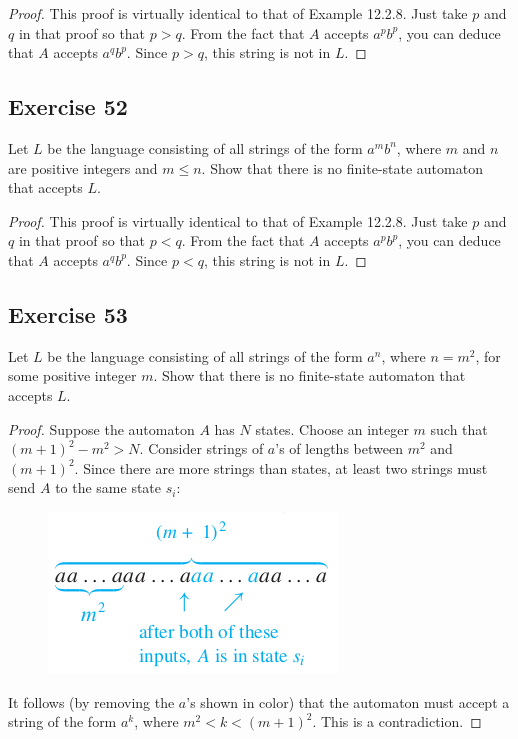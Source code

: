 \documentclass[14pt]{extarticle}
\begin{document}
\begin{proof}
    This proof is virtually identical to that of Example 12.2.8. Just take \(p\) and \(q\) in that proof so that \(p > q\).
    From the fact that \(A\) accepts \(a^pb^p\), you can deduce that \(A\) accepts \(a^qb^p\). Since \(p > q\), this string is
    not in \(L\).
\end{proof}

\subsection{Exercise 52}
Let \(L\) be the language consisting of all strings of the form \(a^mb^n\), where \(m\) and \(n\) are positive integers
and \(m \leq n\). Show that there is no finite-state automaton that accepts \(L\).

\begin{proof}
    This proof is virtually identical to that of Example 12.2.8. Just take \(p\) and \(q\) in that proof so that \(p < q\).
    From the fact that \(A\) accepts \(a^pb^p\), you can deduce that \(A\) accepts \(a^qb^p\). Since \(p < q\), this string is
    not in \(L\).
\end{proof}

\subsection{Exercise 53}
Let \(L\) be the language consisting of all strings of the form \(a^n\), where \(n = m^2\), for some positive integer
\(m\). Show that there is no finite-state automaton that accepts \(L\).

\begin{proof}
    Suppose the automaton \(A\) has \(N\) states. Choose an integer \(m\) such that \((m + 1)^2 - m^2 > N\). Consider
    strings of \(a\)’s of lengths between \(m^2\) and \((m + 1)^2\). Since there are more strings than states, at least two
    strings must send \(A\) to the same state \(s_i\):

    \begin{figure}[ht!]
        \centering
        \includegraphics[scale=0.5]{../images/12.2.53.png}
    \end{figure}

    It follows (by removing the \(a\)’s shown in color) that the automaton must accept a string of the form \(a^k\), where
    \(m^2 < k < (m + 1)^2\). This is a contradiction.
\end{proof}
\end{document}
